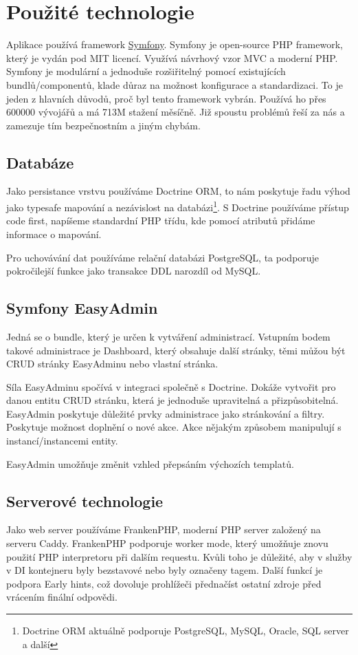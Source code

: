 
\section{Použité technologie}

Aplikace používá framework \href{https://symfony.com/}{Symfony}.
Symfony je open-source PHP framework, který je vydán pod MIT licencí.
Využívá návrhový vzor MVC a moderní PHP.
Symfony je modulární a jednoduše rozšiřitelný pomocí existujících bundlů/componentů, klade důraz na možnost konfigurace a standardizaci.
To je jeden z hlavních důvodů, proč byl tento framework vybrán.
Používá ho přes 600000 vývojářů a má 713M stažení měsíčně.\cite{symfony:what-is}
Již spoustu problémů řeší za nás a zamezuje tím bezpečnostním a jiným chybám.


\subsection{Databáze}
Jako persistance vrstvu používáme Doctrine ORM, to nám poskytuje řadu výhod jako typesafe mapování a nezávislost na databázi\footnote{Doctrine ORM aktuálně podporuje PostgreSQL, MySQL, Oracle, SQL server a další\cite{doctrine-supported-dbs}}.
S Doctrine používáme přístup code first, napíšeme standardní PHP třídu, kde pomocí atributů přidáme informace o mapování. 

Pro uchovávání dat používáme relační databázi PostgreSQL, ta podporuje pokročilejší funkce jako transakce DDL narozdíl od MySQL.  


\subsection{Symfony EasyAdmin}

Jedná se o bundle, který je určen k vytváření administrací.
Vstupním bodem takové administrace je Dashboard, který obsahuje další stránky, těmi můžou být CRUD stránky EasyAdminu nebo vlastní stránka.

Síla EasyAdminu spočívá v integraci společně s Doctrine.
Dokáže vytvořit pro danou entitu CRUD stránku, která je jednoduše upravitelná a přizpůsobitelná.
EasyAdmin poskytuje důležité prvky administrace jako stránkování a filtry.
Poskytuje možnost doplnění o nové akce. Akce nějakým způsobem manipulují s instancí/instancemi entity.

EasyAdmin umožňuje změnit vzhled přepsáním výchozích templatů.


\subsection{Serverové technologie}
Jako web server používáme FrankenPHP, moderní PHP server založený na serveru Caddy.
FrankenPHP podporuje worker mode, který umožňuje znovu použití PHP interpretoru při dalším requestu. Kvůli toho je důležité, aby v služby v DI kontejneru byly bezstavové nebo byly označeny  tagem.
Další funkcí je podpora Early hints, což dovoluje prohlížeči přednačíst ostatní zdroje před vrácením finální odpovědi.

